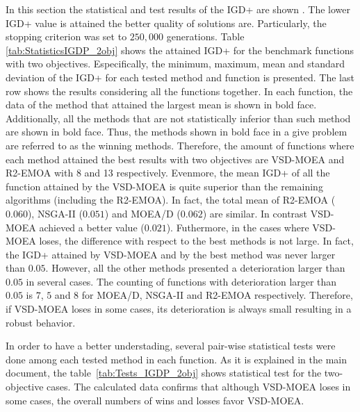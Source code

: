 In this section the statistical and test results of the IGD+ are shown \cite{Joel:Inverted_Generational_Distance_Plus}.
%
The lower IGD+ value is attained the better quality of solutions are.
%
Particularly, the stopping criterion was set to $250,000$ generations.
%
Table \ref{tab:StatisticsIGDP_2obj} shows the attained IGD+ for the benchmark functions with two objectives.
%
Especifically, the minimum, maximum, mean and standard deviation of the IGD+ for each tested method and function is presented.
%
The last row shows the results considering all the functions together.
%
In each function, the data of the method that attained the largest mean is shown in bold face.
%
Additionally, all the methods that are not statistically inferior than such method are shown in bold face.
%
Thus, the methods shown in bold face in a give problem are referred to as the winning methods.
%
Therefore, the amount of functions where each method attained the best results with two objectives are VSD-MOEA and R2-EMOA with 8 and 13 respectively.
%
Evenmore, the mean IGD+ of all the function attained by the VSD-MOEA is quite superior than the remaining algorithms (including the R2-EMOA).
%
In fact, the total mean of R2-EMOA ($0.060$), NSGA-II ($0.051$) and MOEA/D ($0.062$) are similar.
%
In contrast VSD-MOEA achieved a better value ($0.021$).
%
Futhermore, in the cases where VSD-MOEA loses, the difference with respect to the best methods is not large.
%
In fact, the IGD+ attained by VSD-MOEA and by the best method was never larger than $0.05$.
%
However, all the other methods presented a deterioration larger than $0.05$ in several cases.
%
The counting of functions with deterioration larger than $0.05$ is $7$, $5$ and $8$ for MOEA/D, NSGA-II and R2-EMOA respectively.
%
Therefore, if VSD-MOEA loses in some cases, its deterioration is always small resulting in a robust behavior.

In order to have a better understading, several pair-wise statistical tests were done among each tested method in each function.
%
As it is explained in the main document, the table~\ref{tab:Tests_IGDP_2obj} shows statistical test for the two-objective cases.
%
The calculated data confirms that although VSD-MOEA loses in some cases, the overall numbers of wins and losses favor VSD-MOEA.
%

